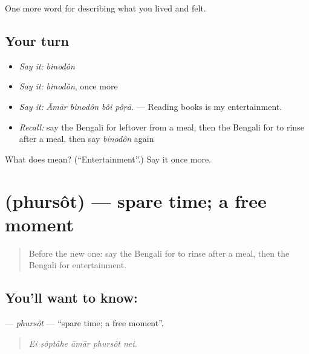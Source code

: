 \begin{grammarlens}[title={What you've built}]
One more word for describing what you lived and felt.
\end{grammarlens}

\subsection*{Your turn}
\begin{itemize}
\raggedright
  \item \emph{Say it:} \emph{binodôn}
  \item \emph{Say it:} \emph{binodôn}, once more
  \item \emph{Say it:} \emph{Āmār binodôn bôi pôṛā.} — Reading books is my entertainment.
  \item \emph{Recall:} say the Bengali for leftover from a meal, then the Bengali for to rinse after a meal, then say \emph{binodôn} again
\end{itemize}

\begin{tcolorbox}[breakable,colback=teal!4,colframe=teal!35!black,title={Before you move on}]
What does  mean? (\textquotedblleft{}Entertainment\textquotedblright{}.) Say it once more.
\end{tcolorbox}
\section[\texorpdfstring{\bn{ফুরসত} (phursôt)}{ফুরসত (phursôt)}]{ (phursôt) — spare time; a free moment}

\label{lesson:BN-C516-phursot}



\begin{quote}
Before the new one: say the Bengali for to rinse after a meal, then the Bengali for entertainment.
\end{quote}

\subsection*{You'll want to know: }
\textbf{} — \emph{phursôt} — \textquotedblleft{}spare time; a free moment\textquotedblright{}.

\begin{quote}
    
\end{quote}

\begin{quote}
\emph{Ei sôptāhe āmār phursôt nei.}
\end{quote}

